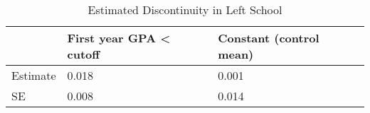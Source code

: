 \begin{table}

\caption{Estimated Discontinuity in Left School}
\centering
\begin{tabular}[t]{l|l|l}
\hline
  & First year GPA < cutoff & Constant (control mean)\\
\hline
Estimate & 0.018 & 0.001\\
\hline
SE & 0.008 & 0.014\\
\hline
\end{tabular}
\end{table}
